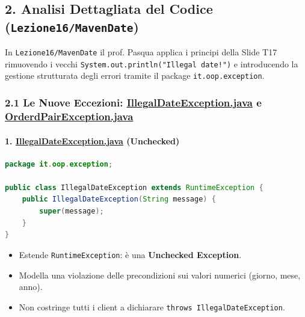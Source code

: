 \documentclass[11pt,a4paper]{article}
\newcommand{\passthrough}[1]{#1}
\providecommand{\tightlist}{\setlength{\itemsep}{0pt}\setlength{\parskip}{0pt}}
\begin{document}
\subsection{\texorpdfstring{2. Analisi Dettagliata del Codice
(\texttt{Lezione16/MavenDate})}{2. Analisi Dettagliata del Codice (Lezione16/MavenDate)}}\label{analisi-dettagliata-del-codice-lezione16mavendate}

In \passthrough{\lstinline!Lezione16/MavenDate!} il prof. Pasqua applica
i principi della Slide T17 rimuovendo i vecchi
\passthrough{\lstinline'System.out.println("Illegal date!")'} e
introducendo la gestione strutturata degli errori tramite il package
\passthrough{\lstinline!it.oop.exception!}.

\subsubsection{\texorpdfstring{2.1 Le Nuove Eccezioni:
\href{file:///home/wally/Documenti/GitHub/Programmazione-II/25-26/Teoria-e-Esercitazioni/Codice-20260902/Lezione16/MavenDate/src/main/java/it/oop/exception/IllegalDateException.java}{IllegalDateException.java}
e
\href{file:///home/wally/Documenti/GitHub/Programmazione-II/25-26/Teoria-e-Esercitazioni/Codice-20260902/Lezione16/MavenDate/src/main/java/it/oop/exception/OrderdPairException.java}{OrderdPairException.java}}{2.1 Le Nuove Eccezioni: IllegalDateException.java e OrderdPairException.java}}\label{le-nuove-eccezioni-illegaldateexception.java-e-orderdpairexception.java}

\paragraph{\texorpdfstring{1.
\href{file:///home/wally/Documenti/GitHub/Programmazione-II/25-26/Teoria-e-Esercitazioni/Codice-20260902/Lezione16/MavenDate/src/main/java/it/oop/exception/IllegalDateException.java}{IllegalDateException.java}
(Unchecked)}{1. IllegalDateException.java (Unchecked)}}\label{illegaldateexception.java-unchecked}

\begin{lstlisting}[language=Java]
package it.oop.exception;

public class IllegalDateException extends RuntimeException {
    public IllegalDateException(String message) {
        super(message);
    }
}
\end{lstlisting}

\begin{itemize}
\tightlist
\item
  Estende \passthrough{\lstinline!RuntimeException!}: è una
  \textbf{Unchecked Exception}.
\item
  Modella una violazione delle precondizioni sui valori numerici
  (giorno, mese, anno).
\item
  Non costringe tutti i client a dichiarare
  \passthrough{\lstinline!throws IllegalDateException!}.
\end{itemize}
\end{document}
